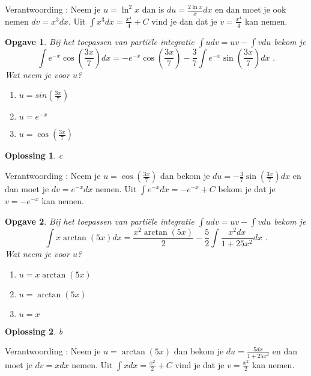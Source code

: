 \documentclass{article}
\newtheorem{opgave}{Opgave}
\newtheorem*{oplossing}{Oplossing}
\begin{document}
Verantwoording : Neem je $u=\ln^2 x$ dan is $du=\frac{2\ln x}{x} dx$ en dan moet je ook nemen $dv=x^3dx$. Uit $\int x^3dx=\frac{x^4}{4}+C$ vind je dan dat je $v=\frac{x^4}{4}$ kan nemen.

\begin{opgave}
Bij het toepassen van parti\"ele integratie $\int udv=uv-\int vdu$ bekom je
\[
\int e^{-x}\cos \left( \frac{3x}{7}  \right)dx=-e^{-x}\cos \left( \frac{3x}{7}  \right)-\frac{3}{7}\int e^{-x}\sin \left( \frac{3x}{7}  \right)dx \text { .}
\]
Wat neem je voor $u$?

\begin{enumerate}[a]
\item $u=sin \left( \frac{3x}{7}  \right)$
\item $u=e^{-x}$
\item $u=\cos \left( \frac{3x}{7}  \right)$
\end{enumerate}

\end{opgave}

\begin{oplossing}
c
\end{oplossing}

Verantwoording : Neem je $u=\cos \left( \frac{3x}{7}  \right)$ dan bekom je $du=-\frac{3}{7}\sin \left(  \frac{3x}{7} \right)dx$ en dan moet je $dv=e^{-x}dx$ nemen.
Uit $\int e^{-x}dx=-e^{-x}+C$ bekom je dat je $v=-e^{-x}$ kan nemen.

\begin{opgave}
Bij het toepassen van parti\"ele integratie $\int udv=uv-\int vdu$ bekom je
\[
\int x \arctan (5x)dx=\frac{x^2 \arctan (5x)}{2}-\frac{5}{2}\int \frac{x^2dx}{1+25x^2}dx \text { .}
\]
Wat neem je voor $u$?

\begin{enumerate}[a]
\item $u=x\arctan (5x)$
\item $u=\arctan (5x)$
\item $u=x$
\end{enumerate}

\end{opgave}

\begin{oplossing}
b
\end{oplossing}

Verantwoording : Neem je $u=\arctan (5x)$ dan bekom je $du = \frac{5dx}{1+25x^2}$ en dan moet je $dv=xdx$ nemen.
Uit $\int xdx=\frac{x^2}{2}+C$ vind je dat je $v=\frac{x^2}{2}$ kan nemen.
\end{document}
